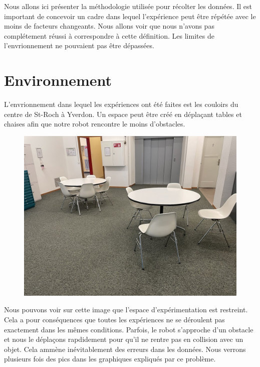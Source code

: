 \documentclass[
	a4paper,									%
	11pt,										%
	twoside,									%
	openright,									%
	notitlepage,									%
	parskip=half,								%
]{scrreprt}										%
\begin{document}
Nous allons ici présenter la méthodologie utilisée pour récolter les données. Il est important de concevoir un 
cadre dans lequel l'expérience peut être répétée avec le moins de facteurs changeants. Nous allons voir que 
nous n'avons pas complétement réussi à correspondre à cette définition. Les limites de l'envrionnement ne 
pouvaient pas être dépassées. \par

\section{Environnement}

L'envrionnement dans lequel les expériences ont été faites est les couloirs du centre de St-Roch à Yverdon. 
Un espace peut être créé en déplaçant tables et chaises afin que notre robot rencontre le moins d'obstacles. 

\begin{figure}[!ht]
	\centering
	\includegraphics[scale=.7]{img/Salle.png}
	\vspace{.5cm}
	\label{img:img1}
\end{figure}

Nous pouvons voir sur cette image que l'espace d'expérimentation est restreint. Cela a pour conséquences que toutes les 
expériences ne se déroulent pas exactement dans les mêmes conditions. Parfois, le robot s'approche d'un obstacle et nous le déplaçons 
rapdidement pour qu'il ne rentre pas en collision avec un objet. 
Cela ammène inévitablement des erreurs dans les données. Nous verrons plusieurs fois des pics dans les graphiques expliqués
par ce problème. \par
\end{document}
